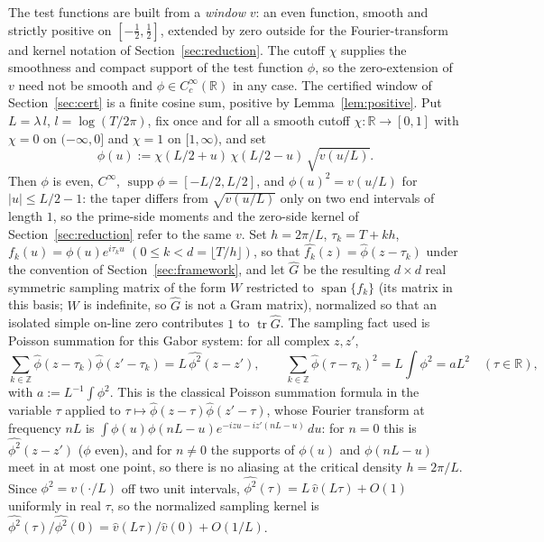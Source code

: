 \documentclass[11pt]{article}
\theoremstyle{definition}
\DeclareMathOperator{\tr}{tr}
\newcommand{\R}{\mathbb{R}}
\newcommand{\Z}{\mathbb{Z}}
\begin{document}
The test functions are built from a \emph{window} $v$: an even function, smooth
and strictly positive on $[-\tfrac12,\tfrac12]$, extended by zero outside for the
Fourier-transform and kernel notation of Section~\ref{sec:reduction}. The cutoff $\chi$ supplies the
smoothness and compact support of the test function $\phi$, so the
zero-extension of $v$ need not be smooth and $\phi\in C^\infty_c(\R)$ in any
case. The certified window of Section~\ref{sec:cert} is a finite cosine sum,
positive by Lemma~\ref{lem:positive}. Put $L=\lambda\,l$, $l=\log(T/2\pi)$, fix
once and for all a smooth cutoff $\chi:\R\to[0,1]$ with $\chi=0$ on $(-\infty,0]$ and $\chi=1$
on $[1,\infty)$, and set
\[
  \phi(u):=\chi(L/2+u)\,\chi(L/2-u)\,\sqrt{v(u/L)} .
\]
Then $\phi$ is even, $C^\infty$, $\operatorname{supp}\phi=[-L/2,L/2]$, and
$\phi(u)^2=v(u/L)$ for $|u|\le L/2-1$: the taper differs from $\sqrt{v(u/L)}$
only on two end intervals of length $1$, so the prime-side moments and the
zero-side kernel of Section~\ref{sec:reduction} refer to the same $v$. Set $h=2\pi/L$,
$\tau_k=T+kh$, $f_k(u)=\phi(u)e^{i\tau_k u}$ $(0\le k<d=\lfloor T/h\rfloor)$,
so that $\widehat{f_k}(z)=\widehat\phi(z-\tau_k)$ under the convention of Section~\ref{sec:framework},
and let $\widehat G$ be the resulting $d\times d$ real symmetric sampling matrix of
the form $W$ restricted to $\operatorname{span}\{f_k\}$ (its matrix in this basis;
$W$ is indefinite, so $\widehat G$ is not a Gram matrix), normalized so that an
isolated simple on-line zero contributes $1$ to $\tr\widehat G$. The sampling fact
used is Poisson summation for this Gabor system: for all complex $z,z'$,
\begin{equation}\label{eq:poisson}
  \sum_{k\in\Z}\widehat\phi(z-\tau_k)\widehat\phi(z'-\tau_k)=L\,\widehat{\phi^2}(z-z'),\qquad
  \sum_{k\in\Z}\widehat\phi(\tau-\tau_k)^2=L\!\int\!\phi^2=aL^2\quad(\tau\in\R),
\end{equation}
with $a:=L^{-1}\!\int\phi^2$. This is the classical Poisson summation formula in
the variable $\tau$ applied to $\tau\mapsto\widehat\phi(z-\tau)\widehat\phi(z'-\tau)$,
whose Fourier transform at frequency $nL$ is
$\int\phi(u)\phi(nL-u)e^{-izu-iz'(nL-u)}\,du$: for $n=0$ this is
$\widehat{\phi^2}(z-z')$ ($\phi$ even), and for $n\ne0$ the supports of
$\phi(u)$ and $\phi(nL-u)$ meet in at most one point, so there is no aliasing
at the critical density $h=2\pi/L$. Since $\phi^2=v(\cdot/L)$ off two unit
intervals, $\widehat{\phi^2}(\tau)=L\,\widehat v(L\tau)+O(1)$ uniformly in real
$\tau$, so the normalized sampling kernel is
$\widehat{\phi^2}(\tau)/\widehat{\phi^2}(0)=\widehat v(L\tau)/\widehat v(0)+O(1/L)$.
\end{document}
